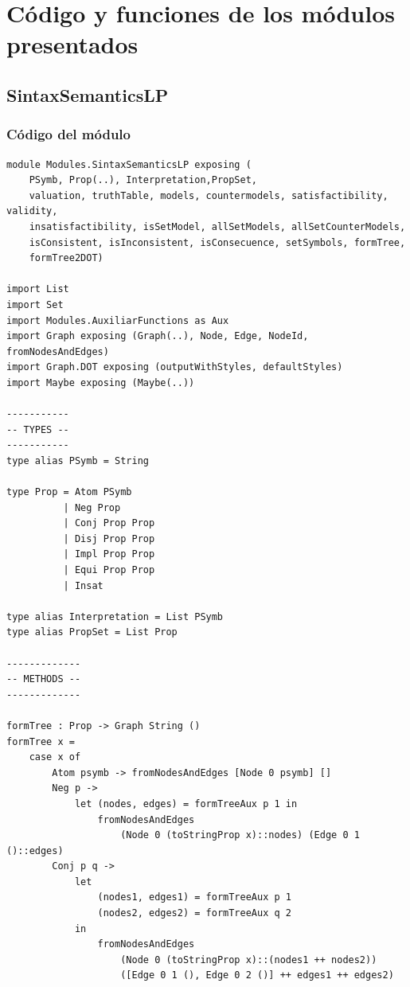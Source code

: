 \documentclass[a4paper]{report}
\begin{document}
\section{Código y funciones de los módulos presentados}
\subsection{SintaxSemanticsLP}
\subsubsection{Código del módulo}
\begin{lstlisting}[caption={Módulo SintaxSemanticsLP}, mathescape=true]
module Modules.SintaxSemanticsLP exposing (
    PSymb, Prop(..), Interpretation,PropSet,
    valuation, truthTable, models, countermodels, satisfactibility, validity, 	
    insatisfactibility, isSetModel, allSetModels, allSetCounterModels, 
    isConsistent, isInconsistent, isConsecuence, setSymbols, formTree, 
    formTree2DOT)

import List
import Set
import Modules.AuxiliarFunctions as Aux
import Graph exposing (Graph(..), Node, Edge, NodeId, fromNodesAndEdges)
import Graph.DOT exposing (outputWithStyles, defaultStyles)
import Maybe exposing (Maybe(..))

-----------
-- TYPES --
-----------
type alias PSymb = String 

type Prop = Atom PSymb
          | Neg Prop
          | Conj Prop Prop
          | Disj Prop Prop
          | Impl Prop Prop
          | Equi Prop Prop
          | Insat

type alias Interpretation = List PSymb
type alias PropSet = List Prop

-------------
-- METHODS --
-------------

formTree : Prop -> Graph String ()
formTree x =
    case x of
        Atom psymb -> fromNodesAndEdges [Node 0 psymb] []
        Neg p -> 
            let (nodes, edges) = formTreeAux p 1 in
                fromNodesAndEdges 
                    (Node 0 (toStringProp x)::nodes) (Edge 0 1 ()::edges)
        Conj p q -> 
            let 
                (nodes1, edges1) = formTreeAux p 1
                (nodes2, edges2) = formTreeAux q 2
            in
                fromNodesAndEdges 
                    (Node 0 (toStringProp x)::(nodes1 ++ nodes2)) 
                    ([Edge 0 1 (), Edge 0 2 ()] ++ edges1 ++ edges2)


\end{lstlisting}
\end{document}
